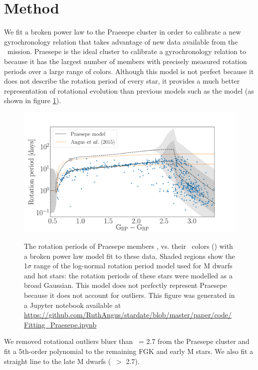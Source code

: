 \section{Method}
\label{section:method}

We fit a broken power law to the Praesepe cluster in order to calibrate a new
gyrochronology relation that takes advantage of new data available from the
\ktwo\ mission.
Praesepe is the ideal cluster to calibrate a gyrochronology relation to
because it has the largest number of members with precisely measured rotation
periods over a large range of colors.
Although this model is not perfect because  it does not describe the rotation
period of every star, it provides a much better representation of rotational
evolution than previous models such as the \citet{angus2015} model (as shown
in figure \ref{fig:praesepe}).
\begin{figure}
  \caption{
    The rotation periods of Praesepe members \citep{douglas2016},
    vs. their \Gaia\ colors (\gcolor) with a broken power law model fit to
    these data.
    Shaded regions show the 1$\sigma$ range of the log-normal rotation period
    model used for M dwarfs and hot stars: the rotation periods of these stars
    were modelled as a broad Gaussian.
    This model does not perfectly represent Praesepe because it does not
    account for outliers.
    This figure was generated in a Jupyter notebook available at
    \url{https://github.com/RuthAngus/stardate/blob/master/paper/code/Fitting_Praesepe.ipynb}
}
  \centering
    \includegraphics[width=1.1\textwidth]{Praesepe.pdf}
\label{fig:praesepe}
\end{figure}
We removed rotational outliers bluer than \gcolor\ = 2.7 from the
Praesepe cluster and fit a 5th-order polynomial to the remaining FGK and
early M stars.
We also fit a straight line to the late M dwarfs (\gcolor\ $>$ 2.7).

